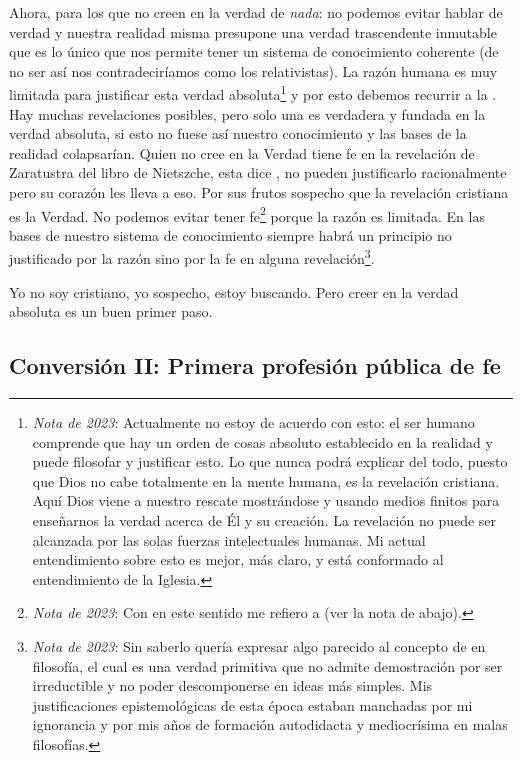 \documentclass[12pt]{article}
\begin{document}
	Ahora, para los que no creen en la verdad de \textit{nada}: no podemos
	evitar hablar de verdad y nuestra realidad misma presupone una verdad
	trascendente inmutable que es lo único que nos permite tener un
	sistema de conocimiento coherente (de no ser así nos contradeciríamos
	como los relativistas). La razón humana es muy limitada para justificar
	esta verdad absoluta\footnote{\textit{Nota de 2023}: Actualmente no
	estoy de acuerdo con esto: el
	ser humano comprende que hay un orden de cosas absoluto establecido en
	la realidad y puede filosofar y justificar esto. Lo que nunca podrá
	explicar del todo, puesto que Dios no cabe totalmente en la mente
	humana, es la revelación cristiana. Aquí Dios viene a nuestro rescate
	mostrándose y usando medios finitos para enseñarnos la verdad acerca de
	Él y su creación. La revelación no puede ser alcanzada por las solas
	fuerzas intelectuales humanas. Mi actual entendimiento sobre esto es
	mejor, más claro, y está conformado al entendimiento de la Iglesia.} y
	por esto debemos recurrir a la .
	Hay muchas revelaciones posibles, pero solo una es verdadera y fundada
	en la verdad absoluta, si esto no fuese así nuestro conocimiento y las
	bases de la realidad colapsarían. Quien no cree en la Verdad tiene fe en
	la revelación de Zaratustra del libro  de Nietszche,
	esta dice , no pueden justificarlo
	racionalmente pero su corazón les lleva a eso. Por sus frutos sospecho
	que la revelación cristiana es la Verdad. No podemos evitar tener
	fe\footnote{\textit{Nota de 2023}: Con  en este sentido me
	refiero a  (ver la nota de abajo).} porque la razón es limitada. En las
	bases de nuestro
	sistema de conocimiento siempre habrá un principio no justificado por la
	razón sino por la fe en alguna
	revelación\footnote{\textit{Nota de 2023}:
	Sin saberlo quería expresar algo parecido al concepto de
	 en filosofía, el cual es una verdad
	primitiva que no admite demostración por ser irreductible y no poder
	descomponerse en ideas más simples. Mis justificaciones epistemológicas
	de esta época estaban manchadas por mi ignorancia y por mis años de
	formación autodidacta y mediocrísima en malas filosofías.}.

	Yo no soy cristiano, yo sospecho, estoy buscando. Pero creer en la
	verdad absoluta es un buen primer paso.

	\newpage

	\subsection{Conversión II: Primera profesión pública de fe}
\end{document}
